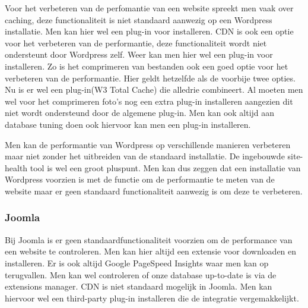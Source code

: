 Voor het verbeteren van de perfomantie van een website spreekt men vaak over caching, deze functionaliteit is niet standaard aanwezig op een Wordpress installatie. Men kan hier wel een plug-in voor installeren. CDN is ook een optie voor het verbeteren van de performantie, deze functionaliteit wordt niet ondersteunt door Wordpress zelf. Weer kan men hier wel een plug-in voor installeren. Zo is het comprimeren van bestanden ook een goed optie voor het verbeteren van de performantie. Hier geldt hetzelfde als de voorbije twee opties. Nu is er wel een plug-in(W3 Total Cache) die alledrie combineert. Al moeten men wel voor het comprimeren foto's nog een extra plug-in installeren aangezien dit niet wordt ondersteund door de algemene plug-in. Men kan ook altijd aan database tuning doen ook hiervoor kan men een plug-in installeren.

Men kan de performantie van Wordpress op verschillende manieren verbeteren maar niet zonder het uitbreiden van de standaard installatie. De ingebouwde site-health tool is wel een groot pluspunt. Men kan dus zeggen dat een installatie van Wordpress voorzien is met de functie om de performantie te meten van de website maar er geen standaard functionaliteit aanwezig is om deze te verbeteren.

\subsubsection{Joomla}
Bij Joomla is er geen standaardfunctionaliteit voorzien om de performance van een website te controleren. Men kan hier altijd een extensie voor downloaden en installeren. Er is ook altijd Google PageSpeed Insights waar men kan op terugvallen. Men kan wel controleren of onze database up-to-date is via de extensions manager. CDN is niet standaard mogelijk in Joomla. Men kan hiervoor wel een third-party plug-in installeren die de integratie vergemakkelijkt.

